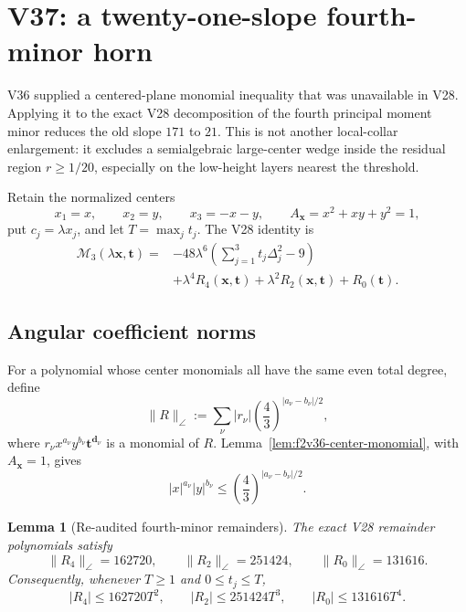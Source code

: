 \documentclass[11pt]{article}
\newtheorem{lemma}[theorem]{Lemma}
\theoremstyle{definition}
\theoremstyle{remark}
\begin{document}


\section{V37: a twenty-one-slope fourth-minor horn}
\label{sec:f2v37-sharp-horn}

V36 supplied a centered-plane monomial inequality that was unavailable in
V28.  Applying it to the exact V28 decomposition of the fourth principal
moment minor reduces the old slope \(171\) to \(21\).  This is not another
local-collar enlargement: it excludes a semialgebraic large-center wedge
inside the residual region \(r\geq1/20\), especially on the low-height
layers nearest the threshold.

Retain the normalized centers
\[
 x_1=x,\qquad x_2=y,\qquad x_3=-x-y,
 \qquad A_{\bm x}=x^2+xy+y^2=1,
\tag{N37.1}
\]
put \(c_j=\lambda x_j\), and let
\(T=\max_jt_j\).  The V28 identity is
\[
\begin{aligned}
 \mathcal M_3(\lambda\bm x,\bm t)
={}&-48\lambda^6
 \left(\sum_{j=1}^3t_j\Delta_j^2-9\right)\\
 &+\lambda^4R_4(\bm x,\bm t)
 +\lambda^2R_2(\bm x,\bm t)+R_0(\bm t).
\end{aligned}
\tag{N37.2}
\]

\subsection{Angular coefficient norms}

For a polynomial whose center monomials all have the same even total
degree, define
\[
 \|R\|_{\angle}:=
 \sum_\nu |r_\nu|
 \left(\frac43\right)^{|a_\nu-b_\nu|/2},
\tag{N37.3}
\]
where \(r_\nu x^{a_\nu}y^{b_\nu}\bm t^{\bm d_\nu}\) is a monomial of
\(R\).  Lemma~\ref{lem:f2v36-center-monomial}, with \(A_{\bm x}=1\),
gives
\[
 |x|^{a_\nu}|y|^{b_\nu}
 \leq\left(\frac43\right)^{|a_\nu-b_\nu|/2}.
\tag{N37.4}
\]

\begin{lemma}[Re-audited fourth-minor remainders]
\label{lem:f2v37-remainders}
The exact V28 remainder polynomials satisfy
\[
 \boxed{
 \|R_4\|_{\angle}=162720,\qquad
 \|R_2\|_{\angle}=251424,\qquad
 \|R_0\|_{\angle}=131616.}
\tag{N37.5}
\]
Consequently, whenever \(T\geq1\) and
\(0\leq t_j\leq T\),
\[
 |R_4|\leq162720T^2,\qquad
 |R_2|\leq251424T^3,\qquad
 |R_0|\leq131616T^4.
\tag{N37.6}
\]
\end{lemma}
\end{document}
